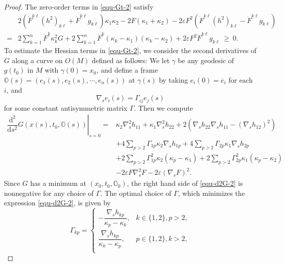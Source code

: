 \documentclass[11pt,reqno]{amsart}
\theoremstyle{remark}
\numberwithin{equation}{section}
\begin{document}
\begin{proof}
    The zero-order terms in \eqref{equ-Gt-2} satisfy
    \begin{align}
    	& 2 \left( \dot{F}^{k\ell}(h^2)_{k\ell} + \dot{F}^{k\ell}g_{k\ell} \right)\kappa_1\kappa_2 - 2 F (\kappa_1+\kappa_2) - 2 \varepsilon F^2 \left( \dot{F}^{k\ell}(h^2)_{k\ell} - \dot{F}^{k\ell}g_{k\ell} \right) \nonumber\\
    	=& 2 \sum\limits_{k=1}^n \dot{F}^k \kappa_k^2 G + 2 \sum\limits_{k=1}^n \dot{F}^k (\kappa_k-\kappa_1)(\kappa_k-\kappa_2) + 2 \varepsilon F^2 \dot{F}^{k\ell}g_{k\ell} ~
    	\geq ~ 0.   \label{equ-zero-2}
    \end{align}
    To estimate the Hessian terms in \eqref{equ-Gt-2}, we consider the second derivatives of $G$ along a curve on $O(M)$ defined as follows: We let $\gamma$ be any geodesic of $g(t_0)$ in $M$ with $\gamma(0)=x_0$, and define a frame $\mathbb{O}(s)=(e_1(s),e_2(s),\cdots,e_n(s))$ at $\gamma(s)$ by taking $e_i(0)=\overline{e}_i$ for each $i$, and
    \begin{equation*}
    	\nabla_s e_i(s) = \Gamma_{ij}e_j(s)
    \end{equation*}
    for some constant antisymmetric matrix $\Gamma$. Then we compute
    \begin{align}
    	\left.\dfrac{\mathrm{d}^2}{\mathrm{d}s^2}G(x(s),t_0,\mathbb{O}(s))\right|_{s=0} = & \kappa_2 \nabla_s^2 h_{11} + \kappa_1 \nabla_s^2 h_{22} + 2 \left( \nabla_s h_{22}\nabla_s h_{11} - (\nabla_s h_{12})^2 \right) \nonumber\\
    	& + 4 \sum\limits_{p>2} \Gamma_{1p}\kappa_2 \nabla_s h_{1p} + 4 \sum\limits_{p>2} \Gamma_{2p}\kappa_1 \nabla_s h_{2p} \nonumber\\
    	&+ 2 \sum\limits_{p>2} \Gamma_{1p}^2 \kappa_2(\kappa_p-\kappa_1) + 2 \sum\limits_{p>2} \Gamma_{2p}^2 \kappa_1 (\kappa_p-\kappa_2) \nonumber\\
    	& - 2 \varepsilon F \nabla_s^2 F - 2 \varepsilon (\nabla_s F)^2.  
    	\label{equ-d2G-2}
    \end{align}
    Since $G$ has a minimum at $(x_0,t_0,\mathbb{O}_0)$, the right hand side of \eqref{equ-d2G-2} is nonnegative for any choice of $\Gamma$. The optimal choice of $\Gamma$, which minimizes the expression \eqref{equ-d2G-2}, is given by
    \begin{equation*}
    	\Gamma_{kp}=\begin{cases}
    		-\dfrac{\nabla_s h_{kp}}{\kappa_p-\kappa_k},&k\in\{1,2\},p>2,\\
    		\dfrac{\nabla_s h_{kp}}{\kappa_k-\kappa_p},&p\in\{1,2\},k>2,\\

\end{cases}
\end{equation*}
\end{proof}
\end{document}
